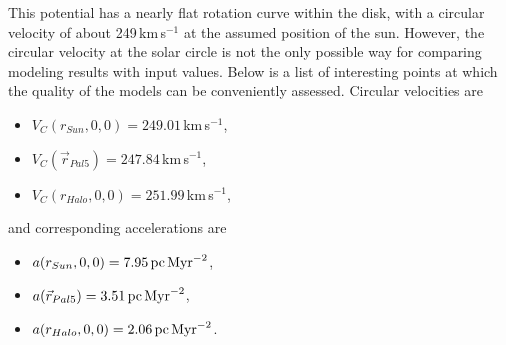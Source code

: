 This potential has a nearly flat rotation curve within the disk, with a circular velocity of about 249\,km\,s$^{-1}$ at the assumed position of the sun. However, the circular velocity at the solar circle is not the only possible way for comparing modeling results with input values. Below is a list of interesting points at which the quality of the models can be conveniently assessed. Circular velocities are
\begin{itemize}
  \item $V_C(r_{Sun}, 0, 0) = 249.01$\,km\,s$^{-1}$,
  \item $V_C(\vec{r}_{Pal5}) = 247.84$\,km\,s$^{-1}$,
  \item $V_C(r_{Halo}, 0, 0) = 251.99$\,km\,s$^{-1}$,
 \end{itemize}
 and corresponding accelerations are 
 \begin{itemize}
  \item $a(r_{Sun}, 0, 0) = 7.95\,\mbox{pc\,Myr}^{-2}$,
  \item $a(\vec{r}_{Pal5}) = 3.51\,\mbox{pc\,Myr}^{-2}$,
  \item $a(r_{Halo}, 0, 0) = 2.06\,\mbox{pc\,Myr}^{-2}$.
\end{itemize}
